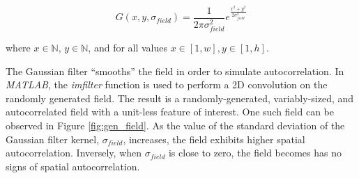 \begin{equation}
G(x,y,\sigma_{field}) = \frac{1}{2 \pi \sigma_{field}^2} e^{\frac{x^2 + y^2}{2\sigma_{field}^2}}
\label{eq:gauss_filt}
\end{equation}

\noindent where $x \in \mathbb{N}$, $y \in \mathbb{N}$, and for all values $x \in [1, w], y \in [1, h]$.

The Gaussian filter ``smooths'' the field in order to simulate autocorrelation. In \textit{MATLAB}, the \textit{imfilter} function is used to perform a 2D convolution on the randomly generated field. The result is a randomly-generated, variably-sized, and autocorrelated field with a unit-less feature of interest. One such field can be observed in Figure \ref{fig:gen_field}. As the value of the standard deviation of the Gaussian filter kernel, $\sigma_{field}$, increases, the field exhibits higher spatial autocorrelation. Inversely, when $\sigma_{field}$ is close to zero, the field becomes has no signs of spatial autocorrelation.


